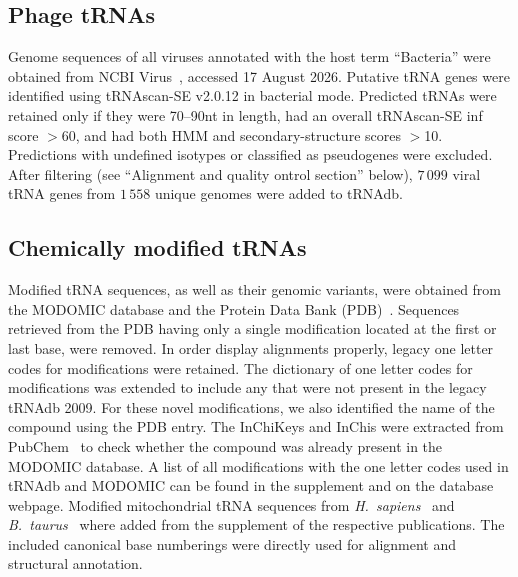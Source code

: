 \documentclass[unnumsec,webpdf,contemporary,large]{oup-authoring-template}
\begin{document}
\subsection{Phage tRNAs} 
Genome sequences of all viruses annotated with the host term ``Bacteria'' were obtained from NCBI Virus~\cite{ncbivirus}, accessed 17 August 2026. Putative tRNA genes
were identified using tRNAscan-SE v2.0.12 \cite{tRNAscan} in bacterial mode. Predicted tRNAs were retained only if they were 70–90nt in length, had an overall tRNAscan-SE inf score $>$60, and had both HMM and secondary-structure scores $>$10. Predictions with undefined isotypes or classified as pseudogenes were excluded. After filtering (see ``Alignment and quality ontrol section'' below), $7\,099$ viral tRNA genes from $1\,558$ unique genomes were added to tRNAdb.


\subsection{Chemically modified tRNAs}\label{subsecmodifiedtRNA}
Modified tRNA sequences, as well as their genomic variants, were obtained
from the MODOMIC \cite{modomics} database and the Protein Data Bank (PDB)~\cite{pdb2000}. 
Sequences retrieved from the PDB having only a single modification located at the first or last base, were removed. 
In order display alignments properly, legacy one letter codes for modifications were retained.  
The dictionary of one letter codes for modifications was extended to include any that were not present in the legacy tRNAdb 2009.
For these novel modifications, we also identified the name of the compound using the  PDB entry. The InChiKeys and InChis were extracted from PubChem~\cite{pubchem2025} to  check whether the compound was already present in the MODOMIC database. A list of all modifications with the one letter codes used in tRNAdb and MODOMIC can be found in the supplement and on the database webpage.
Modified mitochondrial tRNA sequences from \emph{H.\ sapiens}~\cite{humanmtRNA} and \emph{B.\ taurus}~\cite{modtRNAbtaurus} where added from the supplement of the respective publications. The included canonical base numberings were directly used for alignment and structural annotation.
\end{document}
